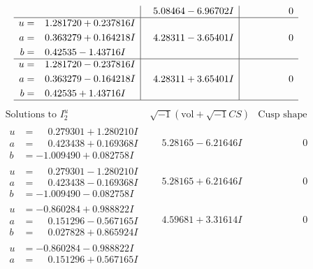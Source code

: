 \documentclass[1p]{elsarticle_modified}
\theoremstyle{definition}
\newcommand{\I}{\sqrt{-1}}
\begin{document}
$$\begin{array}{c|c|c}
 & \phantom{-}5.08464 - 6.96702 I & \phantom{-0.000000 } 0 \\ \hline\begin{aligned}
u &= \phantom{-}1.281720 + 0.237816 I \\
a &= \phantom{-}0.363279 + 0.164218 I \\
b &= \phantom{-}0.42535 - 1.43716 I\end{aligned}
 & \phantom{-}4.28311 - 3.65401 I & \phantom{-0.000000 } 0 \\ \hline\begin{aligned}
u &= \phantom{-}1.281720 - 0.237816 I \\
a &= \phantom{-}0.363279 - 0.164218 I \\
b &= \phantom{-}0.42535 + 1.43716 I\end{aligned}
 & \phantom{-}4.28311 + 3.65401 I & \phantom{-0.000000 } 0\\
 \hline 
 \end{array}$$\newpage$$\begin{array}{c|c|c}  
\text{Solutions to }I^u_{2}& \I (\text{vol} + \sqrt{-1}CS) & \text{Cusp shape}\\
 \hline 
\begin{aligned}
u &= \phantom{-}0.279301 + 1.280210 I \\
a &= \phantom{-}0.423438 + 0.169368 I \\
b &= -1.009490 + 0.082758 I\end{aligned}
 & \phantom{-}5.28165 - 6.21646 I & \phantom{-0.000000 } 0 \\ \hline\begin{aligned}
u &= \phantom{-}0.279301 - 1.280210 I \\
a &= \phantom{-}0.423438 - 0.169368 I \\
b &= -1.009490 - 0.082758 I\end{aligned}
 & \phantom{-}5.28165 + 6.21646 I & \phantom{-0.000000 } 0 \\ \hline\begin{aligned}
u &= -0.860284 + 0.988822 I \\
a &= \phantom{-}0.151296 - 0.567165 I \\
b &= \phantom{-}0.027828 + 0.865924 I\end{aligned}
 & \phantom{-}4.59681 + 3.31614 I & \phantom{-0.000000 } 0 \\ \hline\begin{aligned}
u &= -0.860284 - 0.988822 I \\
a &= \phantom{-}0.151296 + 0.567165 I \\

\end{aligned}
\end{array}$$
\end{document}
